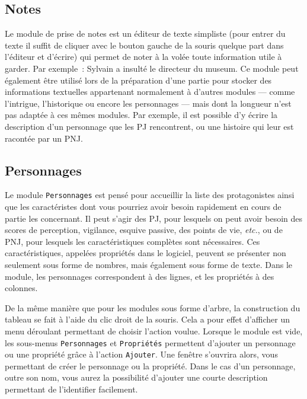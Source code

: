 \documentclass[a4paper,12pt]{article}
\newcommand*{\interfaceitem}[1]{\texttt{#1}}
\newcommand*{\guillemets}[1]{\og #1\fg{}\xspace}
\begin{document}
\subsection{Notes}
\label{sec:notes}

Le module de prise de notes est un éditeur de texte simpliste (pour entrer du texte il suffit de cliquer avec le bouton gauche de la souris quelque part dans l'éditeur et d'écrire) qui permet de noter à la volée toute information utile à garder.
Par exemple~: \guillemets{Sylvain a insulté le directeur du museum}.
Ce module peut également être utilisé lors de la préparation d'une partie pour stocker des informations textuelles appartenant normalement à d'autres modules --- comme l'intrigue, l'historique ou encore les personnages --- mais dont la longueur n'est pas adaptée à ces mêmes modules.
Par exemple, il est possible d'y écrire la description d'un personnage que les PJ rencontrent, ou une histoire qui leur est racontée par un PNJ.

\subsection{Personnages}
\label{sec:perso}

Le module \interfaceitem{Personnages} est pensé pour accueillir la liste des protagonistes ainsi que les caractéristes dont vous pourriez avoir besoin rapidement en cours de partie les concernant.
Il peut s'agir des PJ, pour lesquels on peut avoir besoin des scores de perception, vigilance, esquive passive, des points de vie, \emph{etc.}, ou de PNJ, pour lesquels les caractéristiques complètes sont nécessaires.
Ces caractéristiques, appelées \guillemets{propriétés} dans le logiciel, peuvent se présenter non seulement sous forme de nombres, mais également sous forme de texte.
Dans le module, les personnages correspondent à des lignes, et les propriétés à des colonnes.

De la même manière que pour les modules sous forme d'arbre, la construction du tableau se fait à l'aide du clic droit de la souris.
Cela a pour effet d'afficher un menu déroulant permettant de choisir l'action voulue.
Lorsque le module est vide, les sous-menus \interfaceitem{Personnages} et \interfaceitem{Propriétés} permettent d'ajouter un personnage ou une propriété grâce à l'action \interfaceitem{Ajouter}.
Une fenêtre s'ouvrira alors, vous permettant de créer le personnage ou la propriété.
Dans le cas d'un personnage, outre son nom, vous aurez la possibilité d'ajouter une courte description permettant de l'identifier facilement.
\end{document}
